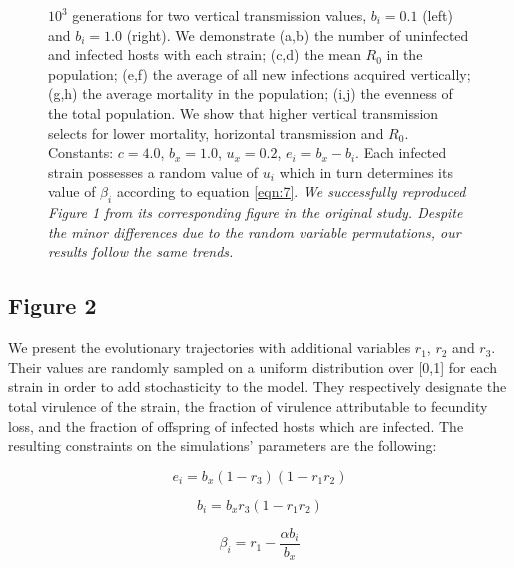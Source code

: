 \begin{figure}[tbph]
{{$10^3$ generations for two vertical transmission values, $b_i = 0.1$ (left) and
$b_i = 1.0$ (right)}. We demonstrate (a,b) the number of uninfected and infected
hosts with each strain; (c,d) the mean $R_0$ in the population; (e,f) the
average of all new infections acquired vertically; (g,h) the average mortality
in the population; (i,j) the evenness of the total population. We show that
higher vertical transmission selects for lower mortality, horizontal
transmission and $R_0$. Constants: $c = 4.0$, $b_x = 1.0$,
$u_x = 0.2$, $e_i = b_x - b_i$. Each infected strain possesses a random value
of $u_i$ \in [$u_x$, 1] which in turn determines its value of $\beta_i$
according to equation \ref{eqn:7}. \textit{We successfully reproduced Figure 1
from its corresponding figure in the original study. Despite the minor
differences due to the random variable permutations, our results follow the
same trends.}
}
\label{fig:figure1}
\end{figure}

\subsection{Figure 2}

We present the evolutionary trajectories with additional variables $r_1$,
$r_2$ and $r_3$. Their values are randomly sampled on a uniform distribution
over [0,1] for each strain in order to add stochasticity to the model. They
respectively designate the total virulence of the strain, the fraction of
virulence attributable to fecundity loss, and the fraction of offspring of
infected hosts which are infected. The resulting constraints on the simulations’
parameters are the following:

\begin{equation}
e_i = b_x(1 - r_3)(1- r_1 r_2)
\label{eqn:9}
\end{equation}

\begin{equation}
b_i = b_x r_3(1 - r_1 r_2)
\label{eqn:10}
\end{equation}

\begin{equation}
\beta_i = r_1 - \frac{\alpha b_i}{b_x}
\label{eqn:11}
\end{equation}

